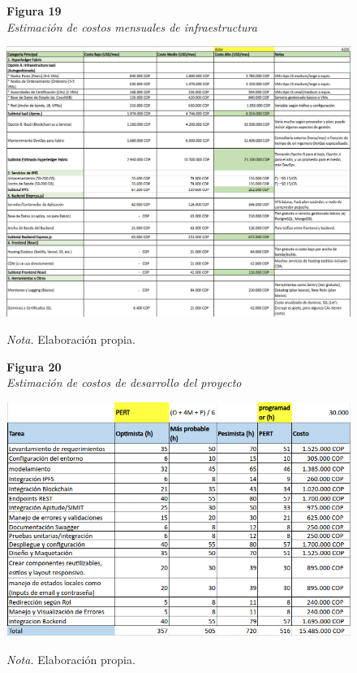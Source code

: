 \begin{figure}[htbp]
    \begin{flushleft}
        \textbf{Figura 19}\\
        \textit{Estimación de costos mensuales de infraestructura}
    \end{flushleft}
    \centering
    \includegraphics[width=\textwidth]{Images/costos2.png}
    \vspace{0.5em}
    \begin{flushleft}
        \textit{Nota.} Elaboración propia.
    \end{flushleft}
    \label{fig:costos2}
\end{figure}

\begin{figure}[htbp]
    \begin{flushleft}
        \textbf{Figura 20}\\
        \textit{Estimación de costos de desarrollo del proyecto}
    \end{flushleft}
    \centering
    \includegraphics[width=\textwidth]{Images/costos3.png}
    \vspace{0.5em}
    \begin{flushleft}
        \textit{Nota.} Elaboración propia.
    \end{flushleft}
    \label{fig:costos3}
\end{figure} 